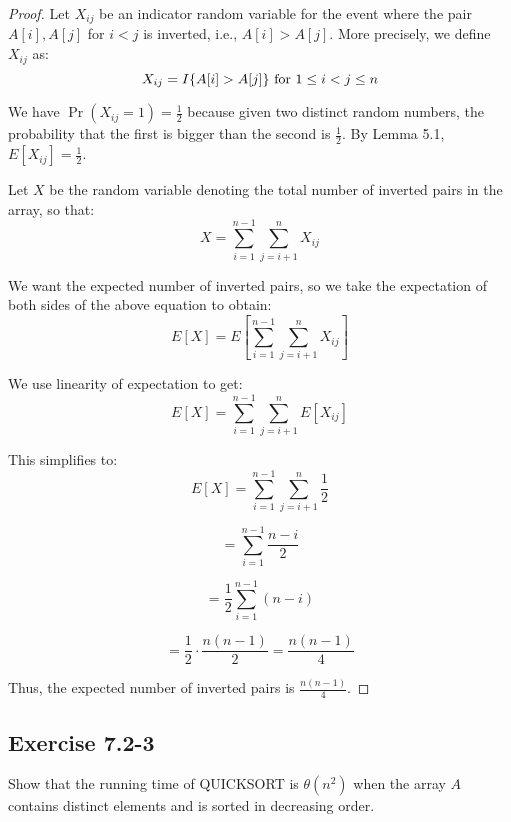 \documentclass{article}
\begin{document}
\begin{proof}

Let $X_{ij}$ be an indicator random variable for the event where the pair $A[i], A[j]$ for $i < j$ is inverted, i.e., $A[i] > A[j]$. 
More precisely, we define $X_{ij}$ as:
\[ X_{ij} = I\{A[i] > A[j]\} \text{ for } 1 \leq i < j \leq n \\
\]

We have $\Pr(X_{ij} = 1) = \frac{1}{2}$ because given two distinct random numbers, the probability that the first is bigger than the second is $\frac{1}{2}$. 
By Lemma 5.1, $E[X_{ij}] = \frac{1}{2}$.

Let $X$ be the random variable denoting the total number of inverted pairs in the array, so that:
\[ X = \sum_{i=1}^{n-1} \sum_{j=i+1}^{n} X_{ij}
\]

We want the expected number of inverted pairs, so we take the expectation of both sides of the above equation to obtain:
\[ E[X] = E\left[ \sum_{i=1}^{n-1} \sum_{j=i+1}^{n} X_{ij} \right]
\]

We use linearity of expectation to get:
\[ E[X] = \sum_{i=1}^{n-1} \sum_{j=i+1}^{n} E[X_{ij}]
\]

This simplifies to:
\[ E[X] = \sum_{i=1}^{n-1} \sum_{j=i+1}^{n} \frac{1}{2}
\]

\[     = \sum_{i=1}^{n-1} \frac{n - i}{2}
\]

\[     = \frac{1}{2} \sum_{i=1}^{n-1} (n - i)
\]

\[     = \frac{1}{2} \cdot \frac{n(n-1)}{2} = \frac{n(n-1)}{4}
\]

Thus, the expected number of inverted pairs is $\frac{n(n-1)}{4}$.
\end{proof}

\subsection*{Exercise 7.2-3}
%
Show that the running time of QUICKSORT is $\theta (n^2)$ when the array $A$ contains distinct elements and is sorted in decreasing order.
\end{document}
